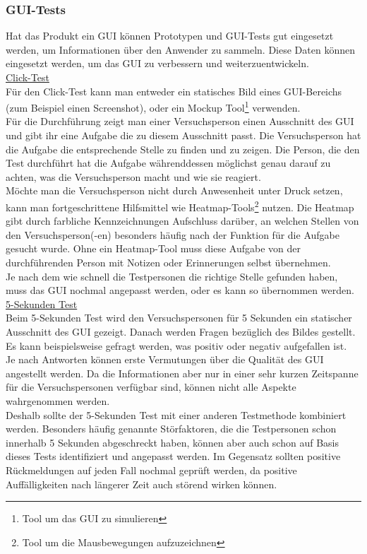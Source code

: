 \documentclass[10pt,a4paper]{article}
\begin{document}
\subsubsection{GUI-Tests}
Hat das Produkt ein GUI können Prototypen und GUI-Tests gut eingesetzt werden, um Informationen über den Anwender zu sammeln. Diese Daten können eingesetzt werden, um das GUI zu verbessern und weiterzuentwickeln.
\vspace{3mm}\\
\noindent
\underline{Click-Test}
\\Für den Click-Test kann man entweder ein statisches Bild eines GUI-Bereichs (zum Beispiel einen Screenshot), oder ein Mockup Tool\footnote{Tool um das GUI zu simulieren} verwenden.
\\Für die Durchführung zeigt man einer Versuchsperson einen Ausschnitt des GUI und gibt ihr eine Aufgabe die zu diesem Ausschnitt passt. Die Versuchsperson hat die Aufgabe die entsprechende Stelle zu finden und zu zeigen. Die Person, die den Test durchführt hat die Aufgabe währenddessen möglichst genau darauf zu achten, was die Versuchsperson macht und wie sie reagiert. 
\\Möchte man die Versuchsperson nicht durch Anwesenheit unter Druck setzen, kann man fortgeschrittene Hilfsmittel wie Heatmap-Tools\footnote{Tool um die Mausbewegungen aufzuzeichnen} nutzen. Die Heatmap gibt durch farbliche Kennzeichnungen Aufschluss darüber, an welchen Stellen von den Versuchsperson(-en) besonders häufig nach der Funktion für die Aufgabe gesucht wurde. Ohne ein Heatmap-Tool muss diese Aufgabe von der durchführenden Person mit Notizen oder Erinnerungen selbst übernehmen. 
\\Je nach dem wie schnell die Testpersonen die richtige Stelle gefunden haben, muss das GUI nochmal angepasst werden, oder es kann so übernommen werden.\vspace{3mm}
\noindent
\underline{5-Sekunden Test}
\\Beim 5-Sekunden Test wird den Versuchspersonen für 5 Sekunden ein statischer Ausschnitt des GUI gezeigt. Danach werden Fragen bezüglich des Bildes gestellt. Es kann beispielsweise gefragt werden, was positiv oder negativ aufgefallen ist. 
\\Je nach Antworten können erste Vermutungen über die Qualität des GUI angestellt werden. Da die Informationen aber nur in einer sehr kurzen Zeitspanne für die Versuchspersonen verfügbar sind, können nicht alle Aspekte wahrgenommen werden. 
\\Deshalb sollte der 5-Sekunden Test mit einer anderen Testmethode kombiniert werden. Besonders häufig genannte Störfaktoren, die die Testpersonen schon innerhalb 5 Sekunden abgeschreckt haben, können aber auch schon auf Basis dieses Tests identifiziert und angepasst werden. Im Gegensatz sollten positive Rückmeldungen auf jeden Fall nochmal geprüft werden, da positive Auffälligkeiten nach längerer Zeit auch störend wirken können.
\end{document}
